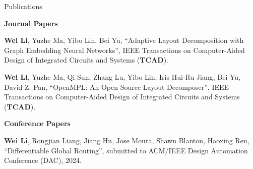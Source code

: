 \newpage
\begin{rSection}{Publications}


    \textbf{Journal Papers}
    \begin{description}[font=\normalfont]
        \item[{[J2]}]{
            \textbf{Wei Li}, Yuzhe Ma, Yibo Lin, Bei Yu, 
            ``Adaptive Layout Decomposition with Graph Embedding Neural Networks'', IEEE Transactions on Computer-Aided Design of Integrated Circuits and Systems (\textbf{TCAD}).
        }
        \item[{[J1]}]{
            \textbf{Wei Li}, Yuzhe Ma, Qi Sun, Zhang Lu, Yibo Lin, Iris Hui-Ru Jiang, Bei Yu, David Z. Pan,
            ``OpenMPL: An Open Source Layout Decomposer'', IEEE Transactions on Computer-Aided Design of Integrated Circuits and Systems (\textbf{TCAD}).
        }
    \end{description}
\textbf{Conference Papers}
\begin{description}[font=\normalfont]
    \item[{[C13]}]{
        \textbf{Wei Li}, Rongjian Liang, Jiang Hu, Jose Moura, Shawn Blanton, Haoxing Ren,
        ``Differentiable Global Routing'', submitted to ACM/IEEE Design Automation Conference ({DAC}), 2024. 
    }


\end{description}
\end{rSection}
